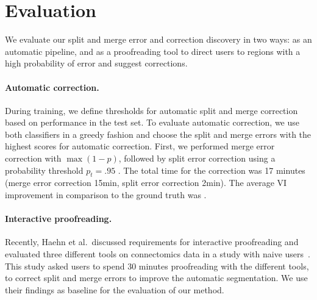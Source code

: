 \section{Evaluation}

We evaluate our split and merge error and correction discovery in two ways: as an automatic pipeline, and as a proofreading tool to direct users to regions with a high probability of error and suggest corrections.

\paragraph{Automatic correction.} During training, we define thresholds for automatic split and merge correction based on performance in the test set. To evaluate automatic correction, we use both classifiers in a greedy fashion and choose the split and merge errors with the highest scores for automatic correction. First, we performed merge error correction with $\max(1-p)$, followed by split error correction using a probability threshold $p_t=.95$ . The total time for the correction was 17 minutes (merge error correction 15min, split error correction 2min). The average VI improvement in comparison to the ground truth was .

\paragraph{Interactive proofreading.}
Recently, Haehn et al.~discussed requirements for interactive proofreading and evaluated three different tools on connectomics data in a study with naive users~\cite{haehn_dojo_2014}. %
This study asked users to spend 30 minutes proofreading with the different tools, to correct split and merge errors to improve the automatic segmentation. We use their findings as baseline for the evaluation of our method.



